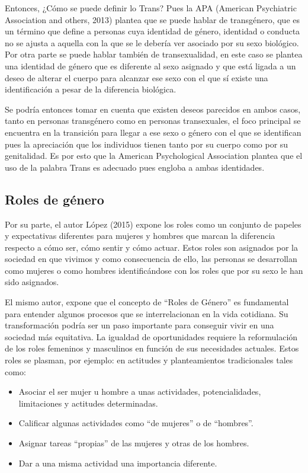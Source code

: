 Entonces, ¿Cómo se puede definir lo Trans? Pues la APA (American Psychiatric
Association and others, 2013) plantea que se puede hablar de transgénero, que es
un término que define a personas cuya identidad de género, identidad o conducta
no se ajusta a aquella con la que se le debería ver asociado por su sexo
biológico.
Por otra parte se puede hablar también de transexualidad, en este caso se
plantea una identidad de género que es diferente al sexo asignado y que está
ligada a un deseo de alterar el cuerpo para alcanzar ese sexo con el que sí
existe una identificación a pesar de la diferencia biológica.

Se podría entonces tomar en cuenta que existen deseos parecidos en ambos casos,
tanto en personas transgénero como en personas transexuales, el foco principal
se encuentra en la transición para llegar a ese sexo o género con el que se
identifican pues la apreciación que los individuos tienen tanto por su cuerpo
como por su genitalidad.
Es por esto que la American Psychological Association plantea que el uso de la
palabra Trans es adecuado pues engloba a ambas identidades.

\subsection{Roles de género}
Por su parte, el autor López (2015) expone los roles como un conjunto de papeles
y expectativas diferentes para mujeres y hombres que marcan la diferencia
respecto a cómo ser, cómo sentir y cómo actuar.
Estos roles son asignados por la sociedad en que vivimos y como consecuencia de
ello, las personas se desarrollan como mujeres o como hombres identificándose
con los roles que por su sexo le han sido asignados.

El mismo autor, expone que el concepto de “Roles de Género” es fundamental para
entender algunos procesos que se interrelacionan en la vida cotidiana.
Su transformación podría ser un paso importante para conseguir vivir en una
sociedad más equitativa.
La igualdad de oportunidades requiere la reformulación de los roles femeninos y
masculinos en función de sus necesidades actuales.
Estos roles se plasman, por ejemplo: en actitudes y planteamientos tradicionales
tales como:

\begin{itemize}
    \item Asociar el ser mujer u hombre a unas actividades, potencialidades,
    limitaciones y actitudes determinadas.
    \item Calificar algunas actividades como “de mujeres” o de “hombres”.
    \item Asignar tareas “propias” de las mujeres y otras de los hombres.
    \item Dar a una misma actividad una importancia diferente.
\end{itemize}

